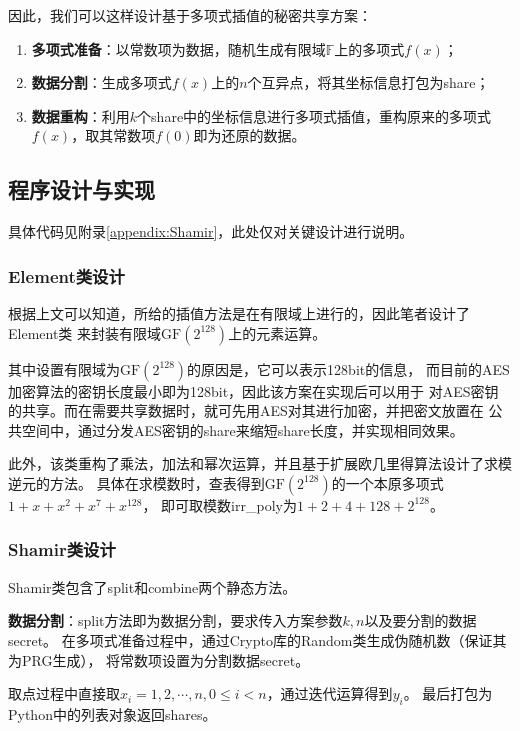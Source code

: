 因此，我们可以这样设计基于多项式插值的秘密共享方案：
\begin{enumerate}
    \item \textbf{多项式准备}：以常数项为数据，随机生成有限域$\mathbb{F}$上的多项式$f(x)$；
    \item \textbf{数据分割}：生成多项式$f(x)$上的$n$个互异点，将其坐标信息打包为share；
    \item \textbf{数据重构}：利用$k$个share中的坐标信息进行多项式插值，重构原来的多项式$f(x)$，取其常数项$f(0)$即为还原的数据。
\end{enumerate}

\newpage
\subsection{程序设计与实现}

    具体代码见附录\ref{appendix:Shamir}，此处仅对关键设计进行说明。

\subsubsection{Element类设计}

根据上文可以知道，所给的插值方法是在有限域上进行的，因此笔者设计了Element类
来封装有限域$\mathrm{GF}(2^{128})$上的元素运算。

其中设置有限域为$\mathrm{GF}(2^{128})$的原因是，它可以表示128bit的信息，
而目前的AES加密算法的密钥长度最小即为128bit，因此该方案在实现后可以用于
对AES密钥的共享。而在需要共享数据时，就可先用AES对其进行加密，并把密文放置在
公共空间中，通过分发AES密钥的share来缩短share长度，并实现相同效果。

此外，该类重构了乘法，加法和幂次运算，并且基于扩展欧几里得算法设计了求模逆元的方法。
具体在求模数时，查表得到$\mathrm{GF}(2^{128})$的一个本原多项式
$1+x+x^2+x^7+x^{128}$，
即可取模数irr\_poly为$1 + 2 + 4 + 128 + 2 ^ {128}$。

\subsubsection{Shamir类设计}

Shamir类包含了split和combine两个静态方法。

\textbf{数据分割}：split方法即为数据分割，要求传入方案参数$k, n$以及要分割的数据secret。
在多项式准备过程中，通过Crypto库的Random类生成伪随机数（保证其为PRG生成），
将常数项设置为分割数据secret。

取点过程中直接取$x_i = 1, 2, \cdots, n, 0\leq i < n$，通过迭代运算得到$y_i$。
最后打包为Python中的列表对象返回shares。

